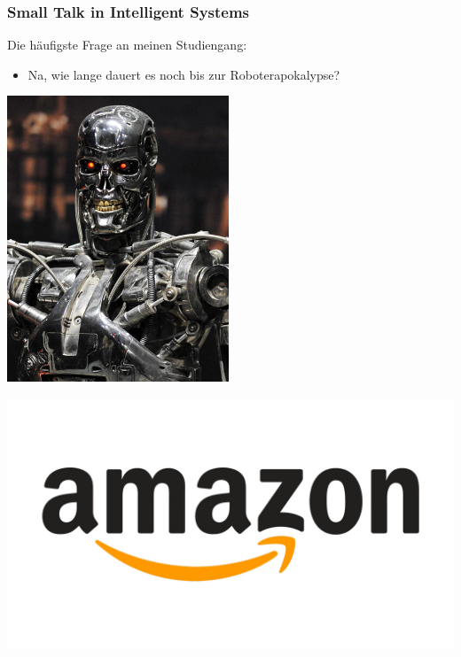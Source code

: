 \documentclass[aspectratio=43,x11names]{beamer}
\begin{document}
\begin{frame}
\frametitle{Small Talk in Intelligent Systems}

\begin{multicols}{2}

Die häufigste Frage an meinen Studiengang:

\pause

\begin{itemize}
\item \glqq Na, wie lange dauert es noch bis zur Roboterapokalypse?\grqq
\end{itemize}

\columnbreak

\includegraphics[height=0.7\textheight,keepaspectratio]{images/Robot-Apocalypse.jpg} 

\end{multicols}

\end{frame}

\begin{frame}
\begin{center}
\includegraphics[width=\textwidth]{images/amazon-logo.jpg} 
\end{center}
\end{frame}
\end{document}
